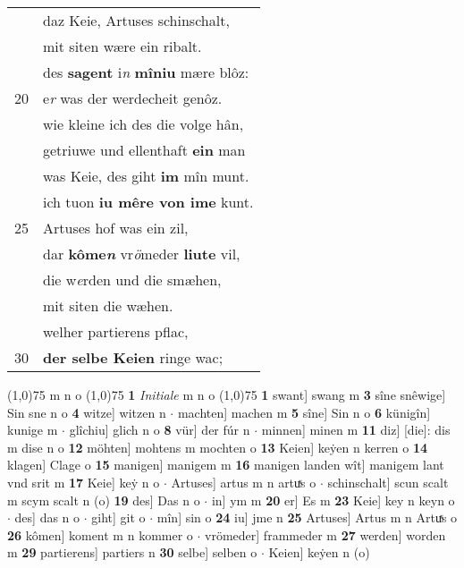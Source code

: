 \documentclass[8pt,a4paper,notitlepage]{article}
\begin{document}
\begin{table}[ht]
\begin{minipage}[t]{0.5\linewidth}
\begin{tabular}{rl}
 & daz Keie, Artuses schinschalt,\\ 
 & mit siten wære ein ribalt.\\ 
 & des \textbf{sagent} i\textit{n} \textbf{mîniu} mære blôz:\\ 
20 & e\textit{r} was der werdecheit genôz.\\ 
 & wie kleine ich des die volge hân,\\ 
 & getriuwe und ellenthaft \textbf{ein} man\\ 
 & was Keie, des giht \textbf{im} mîn munt.\\ 
 & ich tuon \textbf{iu mêre von ime} kunt.\\ 
25 & Artuses hof was ein zil,\\ 
 & dar \textbf{kôme\textit{n}} vr\textit{ö}meder \textbf{liute} vil,\\ 
 & die w\textit{e}rden und die smæhen,\\ 
 & mit siten die wæhen.\\ 
 & welher partierens pflac,\\ 
30 & \textbf{der selbe Keien} ringe wac;\\ 
\end{tabular}
\scriptsize
\line(1,0){75} \newline
m n o \newline
\line(1,0){75} \newline
\textbf{1} \textit{Initiale} m n o  \newline
\line(1,0){75} \newline
\textbf{1} swant] swang m \textbf{3} sîne snêwige] Sin sne n o \textbf{4} witze] witzen n  $\cdot$ machten] machen m \textbf{5} sîne] Sin n o \textbf{6} künigîn] kunige m  $\cdot$ glîchiu] glich n o \textbf{8} vür] der fúr n  $\cdot$ minnen] minen m \textbf{11} diz] [die]: dis m dise n o \textbf{12} möhten] mohtens m mochten o \textbf{13} Keien] keẏen n kerren o \textbf{14} klagen] Clage o \textbf{15} manigen] manigem m \textbf{16} manigen landen wît] manigem lant vnd srit m \textbf{17} Keie] keẏ n o  $\cdot$ Artuses] artus m n artuͯs o  $\cdot$ schinschalt] scun scalt m scym scalt n (o) \textbf{19} des] Das n o  $\cdot$ in] ym m \textbf{20} er] Es m \textbf{23} Keie] key n keyn o  $\cdot$ des] das n o  $\cdot$ giht] git o  $\cdot$ mîn] sin o \textbf{24} iu] jme n \textbf{25} Artuses] Artus m n Artuͯs o \textbf{26} kômen] koment m n kommer o  $\cdot$ vrömeder] frammeder m \textbf{27} werden] worden m \textbf{29} partierens] partiers n \textbf{30} selbe] selben o  $\cdot$ Keien] keẏen n (o) \newline
\end{minipage}
\end{table}
\end{document}
